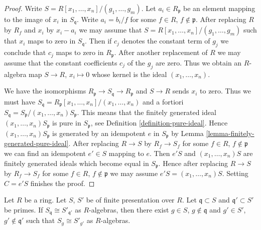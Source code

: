 \begin{proof}
Write $S = R[x_1, \ldots, x_n]/(g_1, \ldots, g_m)$. Let $a_i \in R_\mathfrak p$
be an element mapping to the image of $x_i$ in $S_\mathfrak q$.
Write $a_i = b_i/f$ for some $f \in R$, $f \not \in \mathfrak p$.
After replacing $R$ by $R_f$ and $x_i$ by $x_i - a_i$ we may
assume that $S = R[x_1, \ldots, x_n]/(g_1, \ldots, g_m)$ such
that $x_i$ maps to zero in $S_\mathfrak q$. Then if $c_j$ denotes
the constant term of $g_j$ we conclude that $c_j$ maps to zero
in $R_\mathfrak p$. After another replacement of $R$ we may
assume that the constant coefficients $c_j$ of the $g_j$ are zero.
Thus we obtain an $R$-algebra map $S \to R$, $x_i \mapsto 0$ whose
kernel is the ideal $(x_1, \ldots, x_n)$.

\medskip\noindent
We have the isomorphisms $R_\mathfrak p \to S_\mathfrak q \to R_\mathfrak p$
and $S \to R$ sends $x_i$ to zero. Thus we must have
$S_\mathfrak q = R_\mathfrak p[x_1, \ldots, x_n]/(x_1, \ldots, x_n)$
and a fortiori $S_\mathfrak q = S_\mathfrak p/(x_1, \ldots, x_n)S_\mathfrak p$.
This means that the finitely generated ideal $(x_1, \ldots, x_n)S_\mathfrak p$
is pure in $S_\mathfrak p$, see Definition \ref{definition-pure-ideal}.
Hence $(x_1, \ldots, x_n)S_\mathfrak p$ is generated by an idempotent
$e$ in $S_\mathfrak p$ by Lemma \ref{lemma-finitely-generated-pure-ideal}.
After replacing $R \to S$ by $R_f \to S_f$ for some
$f \in R$, $f \not \in \mathfrak p$ we can find an idempotent
$e' \in S$ mapping to $e$.
Then $e'S$ and $(x_1, \ldots, x_n)S$ are finitely generated ideals
which become equal in $S_\mathfrak p$. Hence after replacing $R \to S$ by
$R_f \to S_f$ for some $f \in R$, $f \not \in \mathfrak p$ we may assume
$e'S = (x_1, \ldots, x_n)S$. Setting $C = e'S$ finishes the proof.
\end{proof}

\begin{lemma}
\label{lemma-isomorphic-local-rings}
Let $R$ be a ring.
Let $S$, $S'$ be of finite presentation over $R$.
Let $\mathfrak q \subset S$ and $\mathfrak q' \subset S'$
be primes. If $S_{\mathfrak q} \cong S'_{\mathfrak q'}$ as
$R$-algebras, then there exist $g \in S$, $g \not \in \mathfrak q$
and $g' \in S'$, $g' \not \in \mathfrak q'$ such that
$S_g \cong S'_{g'}$ as $R$-algebras.
\end{lemma}

